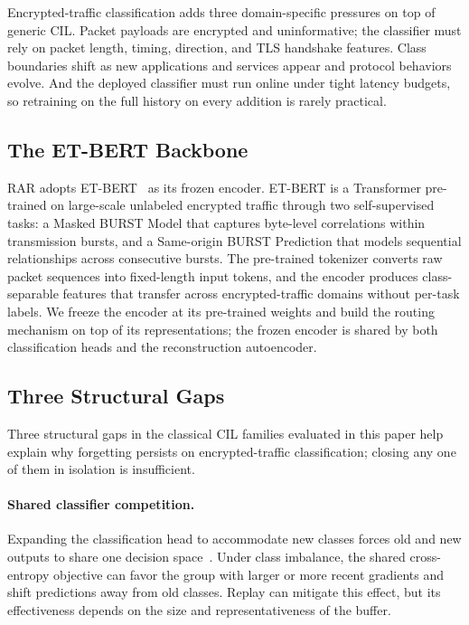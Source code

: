 Encrypted-traffic classification adds three domain-specific pressures on top of generic CIL. Packet payloads are encrypted and uninformative; the classifier must rely on packet length, timing, direction, and TLS handshake features. Class boundaries shift as new applications and services appear and protocol behaviors evolve. And the deployed classifier must run online under tight latency budgets, so retraining on the full history on every addition is rarely practical.

\subsection{The ET-BERT Backbone}

RAR adopts ET-BERT~\cite{lin2022etbert} as its frozen encoder. ET-BERT is a Transformer pre-trained on large-scale unlabeled encrypted traffic through two self-supervised tasks: a Masked BURST Model that captures byte-level correlations within transmission bursts, and a Same-origin BURST Prediction that models sequential relationships across consecutive bursts. The pre-trained tokenizer converts raw packet sequences into fixed-length input tokens, and the encoder produces class-separable features that transfer across encrypted-traffic domains without per-task labels. We freeze the encoder at its pre-trained weights and build the routing mechanism on top of its representations; the frozen encoder is shared by both classification heads and the reconstruction autoencoder.

\subsection{Three Structural Gaps}

Three structural gaps in the classical CIL families evaluated in this paper help explain why forgetting persists on encrypted-traffic classification; closing any one of them in isolation is insufficient.

\paragraph{Shared classifier competition.}
Expanding the classification head to accommodate new classes forces old and new outputs to share one decision space~\cite{rebuffi2017icarl,wu2019bic}. Under class imbalance, the shared cross-entropy objective can favor the group with larger or more recent gradients and shift predictions away from old classes. Replay can mitigate this effect, but its effectiveness depends on the size and representativeness of the buffer.

